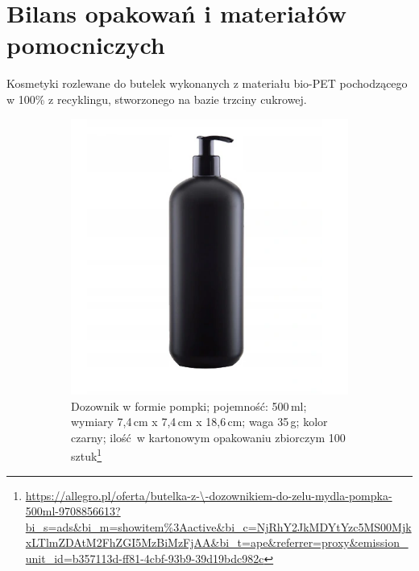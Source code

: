 \section{Bilans opakowań i materiałów pomocniczych}

Kosmetyki rozlewane do butelek wykonanych z materiału bio-PET pochodzącego w 100\% z recyklingu, stworzonego na bazie trzciny cukrowej.

\begin{figure}[h]
	\centering
	\begin{subfigure}[t]{0.45\textwidth}
	\centering
	\includegraphics[width=\textwidth]{./sec9/butelka1.png}
		\caption{Dozownik w formie pompki; pojemność: 500\,ml; wymiary 7,4\,cm x 7,4\,cm x 18,6\,cm; waga 35\,g; kolor czarny; ilość w kartonowym opakowaniu zbiorczym 100 sztuk\protect\footnote{\url{https://allegro.pl/oferta/butelka-z-\-dozownikiem-do-zelu-mydla-pompka-500ml-9708856613?bi_s=ads&bi_m=showitem\%3Aactive&bi_c=NjRhY2JkMDYtYzc5MS00MjkxLTlmZDAtM2FhZGI5MzBiMzFjAA&bi_t=ape&referrer=proxy&emission_unit_id=b357113d-ff81-4cbf-93b9-39d19bdc982c}}}
	\end{subfigure}
	\hfill
	\begin{subfigure}[t]{0.45\textwidth}
	\centering

\end{subfigure}
\end{figure}
